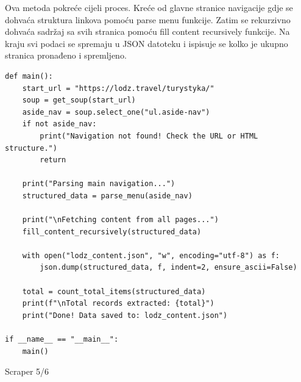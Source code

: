 \documentclass[]{foi}
\begin{document}
Ova metoda pokreće cijeli proces. Kreće od glavne stranice navigacije gdje se dohvaća struktura linkova pomoću parse menu funkcije.
Zatim se rekurzivno dohvaća sadržaj sa svih stranica pomoću fill content recursively funkcije. Na kraju svi podaci se spremaju u JSON datoteku 
i ispisuje se kolko je ukupno stranica pronađeno i spremljeno.

\begin{longlisting}
\begin{verbatim}
def main():
    start_url = "https://lodz.travel/turystyka/"
    soup = get_soup(start_url)
    aside_nav = soup.select_one("ul.aside-nav")
    if not aside_nav:
        print("Navigation not found! Check the URL or HTML structure.")
        return

    print("Parsing main navigation...")
    structured_data = parse_menu(aside_nav)

    print("\nFetching content from all pages...")
    fill_content_recursively(structured_data)

    with open("lodz_content.json", "w", encoding="utf-8") as f:
        json.dump(structured_data, f, indent=2, ensure_ascii=False)

    total = count_total_items(structured_data)
    print(f"\nTotal records extracted: {total}")
    print("Done! Data saved to: lodz_content.json")

if __name__ == "__main__":
    main()
\end{verbatim}
\caption{Scraper 5/6}
\label{lst:scraper5}
\end{longlisting}
\end{document}
